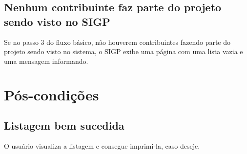 \documentclass[11pt, a4paper,oneside]{book}
\begin{document}
\subsection{Nenhum contribuinte faz parte do projeto sendo visto no SIGP}
Se no passo $3$ do fluxo básico, não houverem contribuintes fazendo parte do projeto sendo visto no sistema, o SIGP exibe uma página com uma lista vazia e uma mensagem informando.

%
%
%
%

\section{Pós-condições}

\subsection{Listagem bem sucedida}

O usuário visualiza a listagem e consegue imprimi-la, caso deseje.

%
\end{document}
